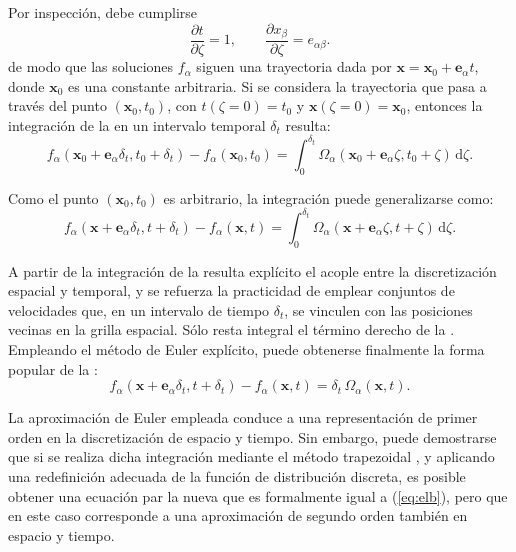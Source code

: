 Por inspecci\'on, debe cumplirse
\begin{equation}
	\dfrac{\partial t}{\partial \zeta} = 1, \qquad
	\dfrac{\partial x_{\beta}}{\partial \zeta} = e_{\alpha\beta}.
\end{equation}
de modo que las soluciones $f_{\alpha}$ siguen una trayectoria dada por $\bm{x}=\bm{x}_0 + \bm{e}_{\alpha}t$, donde $\bm{x}_0$ es una constante arbitraria. Si se considera la trayectoria que pasa a trav\'es del punto $(\bm{x}_0,t_0)$, con $t(\zeta=0)=t_0$ y $\bm{x}(\zeta=0)=\bm{x}_0$, entonces la integraci\'on de la  en un intervalo temporal $\delta_t$ resulta:
\begin{equation}
	f_{\alpha}(\bm{x}_0+\bm{e}_{\alpha}\delta_t,t_0+\delta_t)-f_{\alpha}(\bm{x}_0,t_0)=\int_0^{\delta_t}\Omega_{\alpha}(\bm{x}_0+\bm{e}_{\alpha}\zeta,t_0+\zeta) \, \mbox{d}\zeta.
\end{equation}

Como el punto $(\bm{x}_0,t_0)$ es arbitrario, la integraci\'on puede generalizarse como:
\begin{equation}
	f_{\alpha}(\bm{x}+\bm{e}_{\alpha}\delta_t,t+\delta_t)-f_{\alpha}(\bm{x},t)=\int_0^{\delta_t}\Omega_{\alpha}(\bm{x}+\bm{e}_{\alpha}\zeta,t+\zeta) \, \mbox{d}\zeta.
	\label{eq:elb_integral}
\end{equation}

A partir de la integraci\'on de la  resulta expl\'icito el acople entre la discretizaci\'on espacial y temporal, y se refuerza la practicidad de emplear conjuntos de velocidades que, en un intervalo de tiempo $\delta_t$, se vinculen con las posiciones vecinas en la grilla espacial.
S\'olo resta integral el t\'ermino derecho de la . Empleando el m\'etodo de Euler expl\'icito, puede obtenerse finalmente la forma popular de la \lbe{}:
\begin{equation}
	f_{\alpha}(\bm{x}+\bm{e}_{\alpha}\delta_t,t+\delta_t)-f_{\alpha}(\bm{x},t)=\delta_t \, \Omega_{\alpha}(\bm{x},t).
	\label{eq:elb}
\end{equation}

La aproximaci\'on de Euler empleada conduce a una representaci\'on de primer orden en la discretizaci\'on de espacio y tiempo. Sin embargo, puede demostrarse que si se realiza dicha integraci\'on mediante el m\'etodo trapezoidal \cite{he_discrete_1998}, y aplicando una redefinici\'on adecuada de la funci\'on de distribuci\'on discreta, es posible obtener una ecuaci\'on par la nueva \fdp{} que es formalmente igual a (\ref{eq:elb}), pero que en este caso corresponde a una aproximaci\'on de segundo orden tambi\'en en espacio y tiempo.




